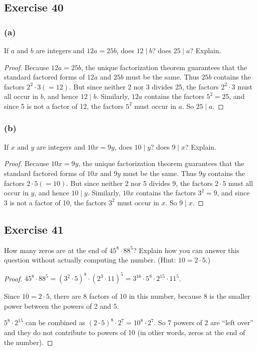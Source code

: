 \documentclass[14pt]{extarticle}
\begin{document}
\subsection{Exercise 40}
\subsubsection{(a)}
If $a$ and $b$ are integers and $12a = 25b$, does $12 \mid b$? does $25 \mid a$? Explain.

\begin{proof}
    Because $12a = 25b$, the unique factorization theorem guarantees that the standard factored forms of $12a$ and $25b$ must be the same. Thus $25b$ contains the factors $2^2 \cdot 3 (=12)$. But since neither 2 nor 3 divides 25, the factors $2^2 \cdot 3$ must all occur in $b$, and hence $12\mid b$. Similarly, $12a$ contains the factors $5^2 = 25$, and since 5 is not a factor of 12, the factors $5^2$ must occur in $a$. So $25\mid a$.
\end{proof}

\subsubsection{(b)}
If $x$ and $y$ are integers and $10x = 9y$, does $10 \mid y$? does $9 \mid x$? Explain.

\begin{proof}
    Because $10x = 9y$, the unique factorization theorem guarantees that the standard factored forms of $10x$ and $9y$ must be the same. Thus $9y$ contains the factors $2 \cdot 5 (=10)$. But since neither 2 nor 5 divides 9, the factors $2 \cdot 5$ must all occur in $y$, and hence $10\mid y$. Similarly, $10x$ contains the factors $3^2 = 9$, and since 3 is not a factor of 10, the factors $3^2$ must occur in $x$. So $9\mid x$.
\end{proof}

\subsection{Exercise 41}
How many zeros are at the end of $45^8 \cdot 88^5$? Explain how you can answer this question without actually computing the number. (Hint: $10 = 2\cdot 5$.)

\begin{proof}
    $45^8 \cdot 88^5 =(3^2 \cdot 5)^8 \cdot (2^3 \cdot 11)^5 = 3^{16} \cdot 5^8 \cdot 2^{15} \cdot 11^5$.

    Since $10 = 2 \cdot 5$, there are 8 factors of 10 in this number, because 8 is the smaller power between the powers of 2 and 5.

    $5^8 \cdot 2^{15}$ can be combined as $(2\cdot5)^8 \cdot 2^7 = 10^8 \cdot 2^7$. So 7 powers of 2 are ``left over'' and they do not contribute to powers of 10 (in other words, zeros at the end of the number).
\end{proof}
\end{document}
